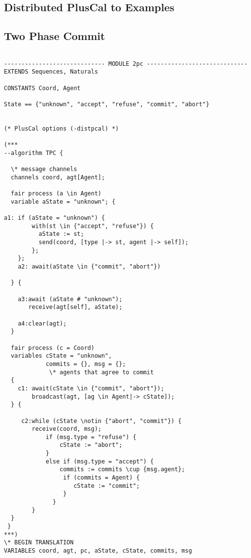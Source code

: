 \begin{appendices}
\chapter{Distributed PlusCal to \tlaplus Examples}
\label{appendix:examples}
\section{Two Phase Commit}

\begin{lstlisting}[caption = \tlaplus translation for Sub-Processes, frame = tlrb, firstnumber = 1]

----------------------------- MODULE 2pc -----------------------------
EXTENDS Sequences, Naturals

CONSTANTS Coord, Agent

State == {"unknown", "accept", "refuse", "commit", "abort"}

    
(* PlusCal options (-distpcal) *)

(***
--algorithm TPC {
 
  \* message channels
  channels coord, agt[Agent];
     
  fair process (a \in Agent)
  variable aState = "unknown"; {

a1: if (aState = "unknown") {
        with(st \in {"accept", "refuse"}) {
          aState := st;
          send(coord, [type |-> st, agent |-> self]);
        };
    };
    a2: await(aState \in {"commit", "abort"})
    
  } {
    
    a3:await (aState # "unknown");
       receive(agt[self], aState); 
       
    a4:clear(agt);
  }

  fair process (c = Coord) 
  variables cState = "unknown",
            commits = {}, msg = {};
             \* agents that agree to commit
  {
    c1: await(cState \in {"commit", "abort"});    
        broadcast(agt, [ag \in Agent|-> cState]);
  } {
        
     c2:while (cState \notin {"abort", "commit"}) {
        receive(coord, msg);
            if (msg.type = "refuse") {
                cState := "abort";
            }
            else if (msg.type = "accept") {
                commits := commits \cup {msg.agent};
                 if (commits = Agent) {
                    cState := "commit";
                 }
              }
        }
  }
 }
***)
\* BEGIN TRANSLATION
VARIABLES coord, agt, pc, aState, cState, commits, msg


\end{lstlisting}
\end{appendices}
